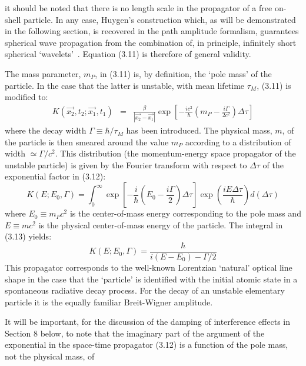 \documentclass [12pt]{article}
\begin{document}
{ it should be noted that there is no length scale in the propagator of a free on-shell
  particle. In any case, Huygen's construction which, as will be demonstrated in the following
  section, is recovered in the path amplitude formalism, guarantees spherical wave propagation
  from the combination of, in principle, infinitely short spherical `wavelets'~\cite{BW1}.
  Equation (3.11) is therefore of general validity.
 \par The mass parameter, $m_P$, in (3.11) is, by  definition, the `pole mass' of the 
  particle. In the case that the latter is unstable, with mean lifetime $\tau_M$, (3.11) is 
   modified to:
   \begin{eqnarray}
    K(\vec{x_2},t_2; \vec{x_1},t_1) & = &  \frac{\beta}{|\vec{x_2}-\vec{x_1}|}
 \exp\left[-\frac{i c^2}{\hbar}( m_P-\frac{i \Gamma}{2 c^2})\Delta  \tau\right] 
 \end{eqnarray}
  where the decay width $\Gamma \equiv \hbar/\tau_M$ has been introduced.
 The physical mass, $m$,  of the particle is then smeared around the value
  $m_P$ according to a distribution of width $\simeq \Gamma/c^2 $. This distribution
  (the momentum-energy space propagator of the unstable particle) is given by the Fourier
  transform with respect to $\Delta  \tau$ of the exponential factor in (3.12):
  \begin{equation}
  K(E;E_0,\Gamma) = \int_0^{\infty}
   \exp\left[-\frac{i}{\hbar}( E_0-\frac{i \Gamma}{2})\Delta  \tau \right]
    \exp\left(\frac{i E \Delta  \tau}{\hbar}\right) d(\Delta  \tau)
   \end{equation}
 where $E_0 \equiv m_P c^2$ is the center-of-mass energy corresponding to the
  pole mass and  $E \equiv m c^2$ is the physical center-of-mass energy of
   the particle. The integral in (3.13) yields:
  \begin{equation}
   K(E;E_0,\Gamma) = \frac{\hbar}{i(E-E_0) -\Gamma/2}
 \end{equation}
  This propagator corresponds to the well-known Lorentzian `natural'
  optical line shape in the case that the `particle' is identified
   with the initial atomic state in a spontaneous radiative decay process.
   For the decay of an unstable elementary particle it is the equally familiar
   Breit-Wigner amplitude. 
   \par It will be important, for the discussion of the damping of
   interference effects in Section 8 below, to note that the imaginary part
   of the argument of the exponential in the space-time propagator
   (3.12) is a function of the pole mass, not the physical mass, of
}
\end{document}
